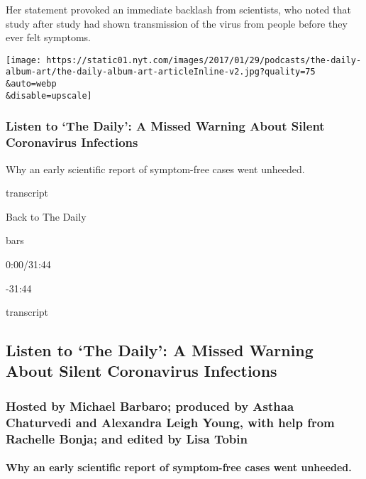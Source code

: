 Her statement provoked an immediate backlash from scientists, who noted
that study after study had shown transmission of the virus from people
before they ever felt symptoms.

\texttt{[image: https://static01.nyt.com/images/2017/01/29/podcasts/the-daily-album-art/the-daily-album-art-articleInline-v2.jpg?quality=75\\\&auto=webp\\\&disable=upscale]}

\hypertarget{listen-to-the-daily-a-missed-warning-about-silent-coronavirus-infections}{%
\subsubsection{Listen to `The Daily': A Missed Warning About Silent
Coronavirus
Infections}\label{listen-to-the-daily-a-missed-warning-about-silent-coronavirus-infections}}

Why an early scientific report of symptom-free cases went unheeded.

transcript

Back to The Daily

bars

0:00/31:44

-31:44

transcript

\hypertarget{listen-to-the-daily-a-missed-warning-about-silent-coronavirus-infections-1}{%
\subsection{Listen to `The Daily': A Missed Warning About Silent
Coronavirus
Infections}\label{listen-to-the-daily-a-missed-warning-about-silent-coronavirus-infections-1}}

\hypertarget{hosted-by-michael-barbaro-produced-by-asthaa-chaturvedi-and-alexandra-leigh-young-with-help-from-rachelle-bonja-and-edited-by-lisa-tobin}{%
\subsubsection{Hosted by Michael Barbaro; produced by Asthaa Chaturvedi
and Alexandra Leigh Young, with help from Rachelle Bonja; and edited by
Lisa
Tobin}\label{hosted-by-michael-barbaro-produced-by-asthaa-chaturvedi-and-alexandra-leigh-young-with-help-from-rachelle-bonja-and-edited-by-lisa-tobin}}

\hypertarget{why-an-early-scientific-report-of-symptom-free-cases-went-unheeded}{%
\paragraph{Why an early scientific report of symptom-free cases went
unheeded.}\label{why-an-early-scientific-report-of-symptom-free-cases-went-unheeded}}

